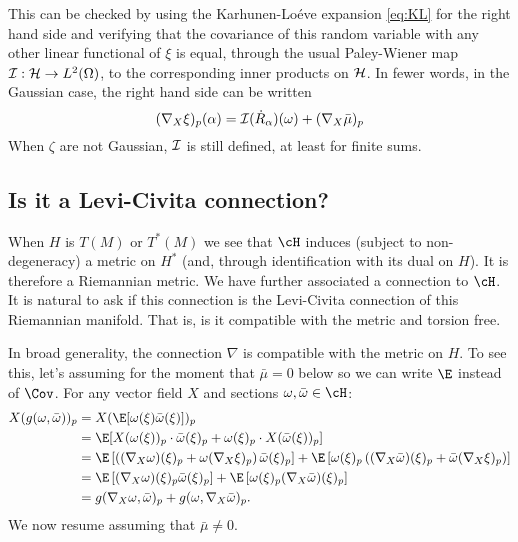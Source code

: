 \documentclass{article}
\newcommand{\randsec}{\xi}
\newcommand{\meansec}{\bar{\mu}}
\begin{document}
\begin{eqaution}
This can be checked by using the Karhunen-Lo\'eve expansion
\eqref{eq:KL} for the right hand side and verifying that the
covariance of this random variable with any other linear functional of
$\randsec$ is equal, through the usual Paley-Wiener map ${\cal I}:{\cal H}
\to L^2(\Omega)$, to the corresponding inner products on ${\cal
  H}$. In fewer words, in the Gaussian case, the right hand side can be written
\begin{equation}
  \label{eq:pathwise:2}
(\nabla_X\randsec)_p(\alpha) = {\cal I}(\dot{R}_{\alpha})(\omega) + (\nabla_X \meansec)_p
\end{equation}
When $\zeta$ are not Gaussian, ${\cal I}$ is still defined, at least for finite sums.

\subsection{Is it a Levi-Civita connection?}

When $H$ is $T(M)$ or $T^*(M)$ we see that $\cH$ induces (subject to non-degeneracy) a metric on
$H^*$ (and, through identification with its dual on $H$).
It is therefore a Riemannian metric. We have further associated a
connection to $\cH$. It is natural to ask if this connection is the Levi-Civita connection
of this Riemannian manifold. That is, is it compatible with the metric and torsion free.

In broad generality, the connection $\nabla$ is compatible with the metric on $H$.
To see this, let's assuming for the moment that $\meansec=0$ below so we can write $\E$ instead of $\Cov$.
For any vector field $X$ and sections $\omega, \bar{\omega} \in \cH$:
$$
\begin{aligned}
  X(g(\omega, \bar{\omega}))_p &= X(\E[\omega(\randsec) \bar{\omega}(\randsec)])_p \\
  &= \E[X(\omega(\randsec))_p \cdot \bar{\omega}(\randsec)_p + \omega(\randsec)_p \cdot X(\bar{\omega}(\randsec))_p] \\
&  = \E\left[\left((\nabla_X\omega)(\randsec)_p + \omega (\nabla_X\randsec)_p\right) \bar{\omega}(\randsec)_p\right] + \E\left[\omega(\randsec)_p \left((\nabla_X\bar{\omega})(\randsec)_p + \bar{\omega} (\nabla_X\randsec)_p\right) \right] \\
  &= \E\left[(\nabla_X\omega)(\randsec)_p \bar{\omega}(\randsec)_p\right] + \E\left[\omega(\randsec)_p (\nabla_X\bar{\omega})(\randsec)_p \right] \\
  &= g(\nabla_X\omega, \bar{\omega})_p + g(\omega, \nabla_X\bar{\omega})_p.
\end{aligned}
$$
We now resume assuming that $\meansec \neq 0$.


\end{eqaution}
\end{document}
